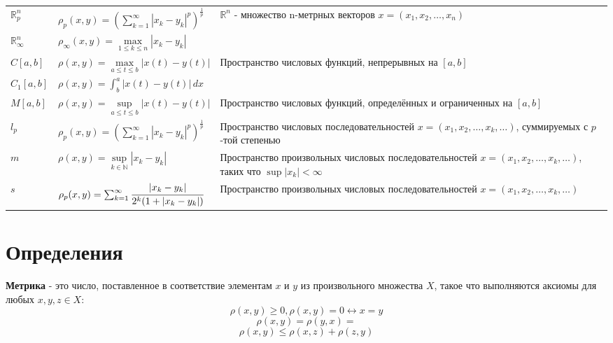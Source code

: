 {\begin{tabular}{||p{2.5cm}|m{6cm}|p{7cm}||}
      $\mathbb{R}^n_p$      & $\rho_p (x,y)=(\sum_{k = 1}^{\infty}|x_k-y_k|^p)^\frac{1}{p}$            & \multirow{2}{6cm}{$\mathbb{R}^n$ - множество n-метрных векторов $x=(x_1,x_2,\dots,x_n)$  }                         \\
      \cline{1-2}
      $\mathbb{R}^n_\infty$ & $\rho_\infty (x,y)=\underset{1\leq k\leq n}{\max}|x_k-y_k|$              &                                                                                                                    \\
      \hline
      $C[a,b]$              & $\rho (x,y)=\underset{a \leq t \leq b}{\max}|x(t)-y(t)|$                 & \multirow{2}{6cm}{Пространство числовых функций, непрерывных на $[a,b]$}                                           \\
      \cline{1-2}
      $C_1[a,b]$            & $\rho (x,y)=\int_{b}^{a}|x(t)-y(t)|\,dx $                                &                                                                                                                    \\[5pt]
      \hline
      $M[a,b]$              & $\rho (x,y)=\underset{a \leq t \leq b}{\sup}|x(t)-y(t)|$                 & Пространство числовых функций, определённых и ограниченных на $[a,b]$                                              \\
      \hline
      $l_p$                 & $\rho_p (x,y)=(\sum_{k = 1}^{\infty}|x_k-y_k|^p)^\frac{1}{p}$            & Пространство числовых последовательностей $x=(x_1,x_2,\dots,x_k,\dots)$, суммируемых с $p$-той степенью            \\
      \hline
      $m$                   & $\rho (x,y)=\underset{k \in \mathbb{N} }{\sup}|x_k-y_k|$                 & Пространство произвольных числовых последовательностей $x=(x_1,x_2,\dots,x_k,\dots)$, таких что $\sup|x_k|<\infty$ \\
      \hline
      $s$                   & $\rho_p (x,y)=\sum_{k = 1}^{\infty} \cfrac{|x_k-y_k|}{2^k(1+|x_k-y_k|)}$ & Пространство произвольных числовых последовательностей $x=(x_1,x_2,\dots,x_k,\dots)$                               \\
      \hline
  \end{tabular}}


\section{Определения}

\textbf{Метрика} - это число, поставленное в соответствие элементам $x$ и $y$ из произвольного множества $X$, такое что выполняются аксиомы для любых $x,y,z\in X$:
\[\rho(x,y)\geq 0,\rho(x,y)=0\longleftrightarrow x=y\]
\[\rho(x,y)=\rho(y,x)=\]
\[\rho(x,y)\leqslant \rho(x,z)+\rho(z,y)\]

